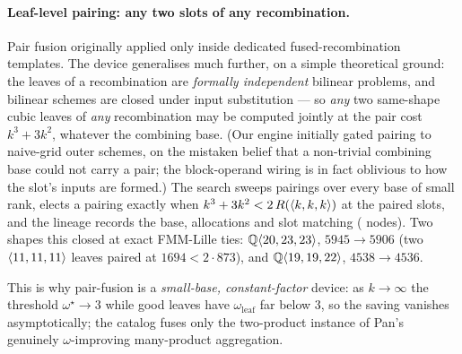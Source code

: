 \paragraph{Leaf-level pairing: any two slots of any recombination.}
Pair fusion originally applied only inside dedicated fused-recombination templates. The
device generalises much further, on a simple theoretical ground: the leaves of a
recombination are \emph{formally independent} bilinear problems, and bilinear schemes are
closed under input substitution --- so \emph{any} two same-shape cubic leaves of \emph{any}
recombination may be computed jointly at the pair cost \(k^3+3k^2\), whatever the combining
base. (Our engine initially gated pairing to naive-grid outer schemes, on the mistaken
belief that a non-trivial combining base could not carry a pair; the block-operand wiring
is in fact oblivious to how the slot's inputs are formed.) The search sweeps pairings over
every base of small rank, elects a pairing exactly when
\(k^3+3k^2 < 2\,R(\langle k, k, k \rangle)\) at the paired slots, and the lineage records the
base, allocations and slot matching ( nodes). Two shapes this closed
at exact FMM-Lille ties: \(\mathbb{Q}\langle 20, 23, 23 \rangle\), \(5945 \to 5906\) (two
\(\langle 11, 11, 11 \rangle\) leaves paired at \(1694 < 2 \cdot 873\)), and
\(\mathbb{Q}\langle 19, 19, 22 \rangle\), \(4538 \to 4536\).

This is why pair-fusion is a \emph{small-base, constant-factor} device: as \(k\to\infty\)
the threshold \(\omega^\star\to 3\) while good leaves have \(\omega_{\mathrm{leaf}}\) far
below \(3\), so the saving vanishes asymptotically; the catalog fuses only the two-product
instance of Pan's genuinely \(\omega\)-improving many-product aggregation.

